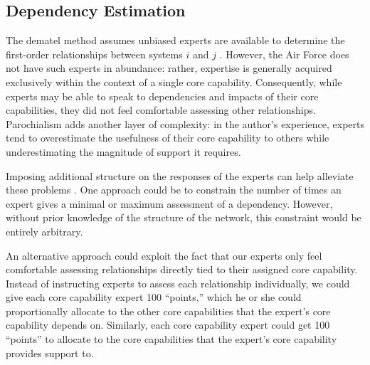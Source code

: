 \documentclass{article}
\begin{document}
\subsection{Dependency Estimation}
The \ac{dematel} method assumes unbiased experts are available to determine the first-order relationships between systems $i$ and $j$ \citep{dematel-overview}. However, the Air Force does not have such experts in abundance: rather, expertise is generally acquired exclusively within the context of a single core capability. Consequently, while experts may be able to speak to dependencies and impacts of their core capabilities, they did not feel comfortable assessing other relationships. Parochialism adds another layer of complexity: in the author's experience, experts tend to overestimate the usefulness of their core capability to others while underestimating the magnitude of support it requires.

Imposing additional structure on the responses of the experts can help alleviate these problems \citep{ahp}. One approach could be to constrain the number of times an expert gives a minimal or maximum assessment of a dependency. However, without prior knowledge of the structure of the network, this constraint would be entirely arbitrary. 

An alternative approach could exploit the fact that our experts only feel comfortable assessing relationships directly tied to their assigned core capability. Instead of instructing experts to assess each relationship individually, we could give each core capability expert 100 ``points,'' which he or she could proportionally allocate to the other core capabilities that the expert's core capability depends on. Similarly, each core capability expert could get 100 ``points'' to allocate to the core capabilities that the expert's core capability provides support to. 
\end{document}
